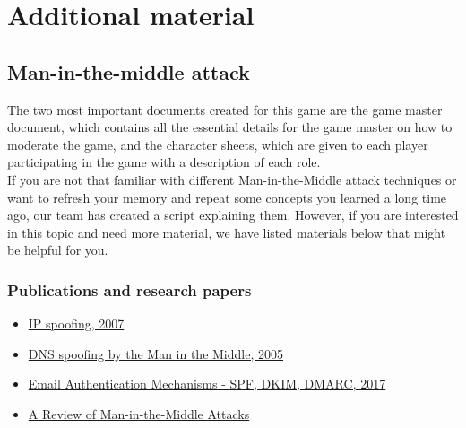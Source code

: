 \chapter{Additional material}
\section{Man-in-the-middle attack} 
The two most important documents created for this game are the game master document, which contains all the essential details for the game master on how to moderate the game, and the character sheets, which are given to each player participating in the game with a description of each role. \\

If you are not that familiar with different Man-in-the-Middle attack techniques or want to refresh your memory and repeat some concepts you learned a long time ago, our team has created a script explaining them. 
However, if you are interested in this topic and need more material, we have listed materials below that might be helpful for you.


\subsection{Publications and research papers}

\begin{itemize}
    \item \href{https://citeseerx.ist.psu.edu/viewdoc/download?doi=10.1.1.477.5420&rep=rep1&type=pdf}{IP spoofing, 2007}
    \item \href{http://citeseerx.ist.psu.edu/viewdoc/download;jsessionid=083EB8C204EC80C0689415229B007420?doi=10.1.1.180.5419&rep=rep1&type=pdf}{DNS spoofing by the Man in the Middle, 2005}
    \item \href{https://nvlpubs.nist.gov/nistpubs/TechnicalNotes/NIST.TN.1945.pdf}{Email Authentication Mechanisms - SPF, DKIM, DMARC, 2017}
    \item \href{https://arxiv.org/pdf/1504.02115.pdf}{A Review of Man-in-the-Middle Attacks}
\end{itemize}

